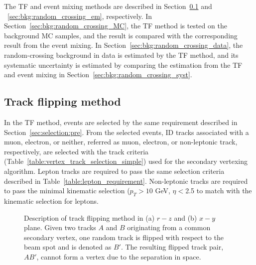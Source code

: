 The TF and event mixing methods are described in Section~\ref{sec:bkg:random_crossing_tf} and ~\ref{sec:bkg:random_crossing_em}, respectively. In Section~\ref{sec:bkg:random_crossing_MC}, the TF method is tested on the background MC samples, and the result is compared with the corresponding result from the event mixing. In Section~\ref{sec:bkg:random_crossing_data}, the random-crossing background in data is estimated by the TF method, and its systematic uncertainty is estimated by comparing the estimation from the TF and event mixing in Section~\ref{sec:bkg:random_crossing_syst}.

\subsection{Track flipping method}
\label{sec:bkg:random_crossing_tf}

In the TF method, events are selected by the same requirement described in Section~\ref{sec:selection:pre}. From the selected events, ID tracks associated with a muon, electron, or neither, referred as muon, electron, or non-leptonic track, respectively, are selected with the track criteria (Table~\ref{table:vertex_track_selection_simple}) used for the secondary vertexing algorithm. Lepton tracks are required to pass the same selection criteria described in Table~\ref{table:lepton_requirement}. Non-leptonic tracks are required to pass the minimal kinematic selection ($p_{T} > 10$ GeV, $\eta < $2.5 to match with the kinematic selection for leptons.

\begin{figure}[!htb]
	\centering
	\caption{Description of track flipping method in (a) $r-z$ and (b) $x-y$ plane. Given two tracks $A$ and $B$ originating from a common secondary vertex, one random track is flipped with respect to the beam spot and is denoted as $B'$. The resulting flipped track pair, $AB'$, cannot form a vertex due to the separation in space.}
	\label{fig:TF_diagram}
\end{figure}

